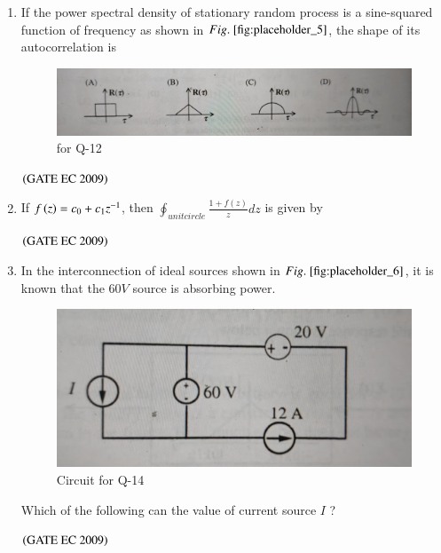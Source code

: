 \documentclass[journal,12pt,onecolumn]{IEEEtran}
\theoremstyle{remark}
\begin{document}
\begin{enumerate}
\item If the power spectral density of stationary random process is a sine-squared function of frequency as shown in $\figref{fig:placeholder_5}$, the shape of its autocorrelation is
\begin{figure}[H]
    \centering
    \includegraphics[width=0.5\columnwidth]{figs/fig_5.jpg}
    \caption{\centering for Q-12}
    \label{fig:placeholder_5}
\end{figure}
\hfill $\brak{\text{GATE EC 2009}}$

\item If $f\brak{z} = c_0 + c_1z^{-1}$, then $\oint_{unit circle} \frac{1+f(z)}{z} dz$ is given by
\begin{enumerate}
\end{enumerate}
\hfill $\brak{\text{GATE EC 2009}}$

\item In the interconnection of ideal sources shown in $\figref{fig:placeholder_6}$, it is known that the $60 V$ source is absorbing power.
\begin{figure}[H]
    \centering
    \includegraphics[width=0.5\columnwidth]{figs/fig_6.jpg}
    \caption{\centering Circuit for Q-14}
    \label{fig:placeholder_6}
\end{figure}
Which of the following can the value of current source ${I}$ ?

\begin{enumerate}
\end{enumerate}
\hfill $\brak{\text{GATE EC 2009}}$


\end{enumerate}
\end{document}
